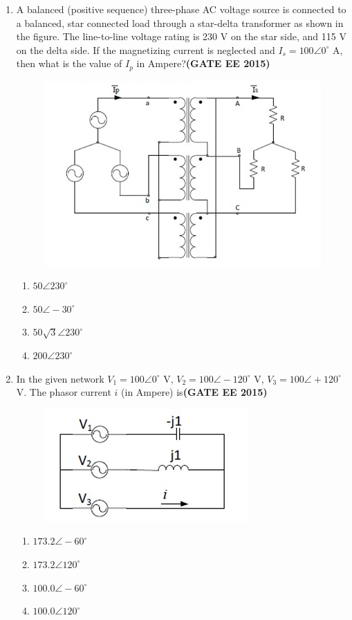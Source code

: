 \documentclass[a4paper,12pt]{exam}
\theoremstyle{remark}
\begin{document}
\begin{enumerate}
\item A balanced (positive sequence) three-phase AC voltage source is connected to a balanced, star connected load through a star-delta transformer as shown in the figure. The line-to-line voltage rating is 230 V on the star side, and 115 V on the delta side. If the magnetizing current is neglected and $I_s = 100 \angle 0^\circ$ A, then what is the value of $I_p$ in Ampere?\hfill{\textbf{(GATE EE 2015)}}
\begin{figure}[H]
    \centering
    \includegraphics[width=0.8\columnwidth]{figs/2Q 53.png}
    \caption{}
    \label{fig:placeholder}
\end{figure}
\begin{multicols}{4}
    \begin{enumerate}
        \item $50 \angle 230^\circ$
        \item $50 \angle -30^\circ$
        \item $50\sqrt{3}\angle 230^\circ$
        \item $200\angle 230^\circ$
    \end{enumerate}
\end{multicols}
\item In the given network $V_1 = 100\angle 0^\circ$ V, $V_2 = 100\angle -120^\circ$ V, $V_3 = 100\angle +120^\circ$ V. The phasor current $i$ (in Ampere) is\hfill{\textbf{(GATE EE 2015)}}
\begin{figure}[H]
    \centering
    \includegraphics[width=0.5\columnwidth]{figs/2Q 54.png}
    \caption{}
    \label{fig:placeholder}
\end{figure}
\begin{multicols}{4}
    \begin{enumerate}
        \item $173.2\angle -60^\circ$
        \item $173.2\angle 120^\circ$
        \item $100.0\angle -60^\circ$
        \item $100.0\angle 120^\circ$
    \end{enumerate}
\end{multicols}


\end{enumerate}
\end{document}
